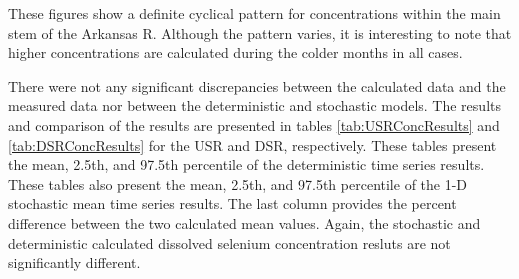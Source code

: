 These figures show a definite cyclical pattern for concentrations within the main stem of the Arkansas R.  Although the pattern varies, it is interesting to note that higher concentrations are calculated during the colder months in all cases.

There were not any significant discrepancies between the calculated data and the measured data nor between the deterministic and stochastic models.  The results and comparison of the results are presented in tables \ref{tab:USRConcResults} and \ref{tab:DSRConcResults} for the USR and DSR, respectively.  These tables present the mean, 2.5th, and 97.5th percentile of the deterministic time series results.  These tables also present the mean, 2.5th, and 97.5th percentile of the 1-D stochastic mean time series results.  The last column provides the percent difference between the two calculated mean values.  Again, the stochastic and deterministic calculated dissolved selenium concentration resluts are not significantly different.

\subtabletop
\begin{table}[htbp]
	\centering
  \caption[USR dissolved selenium concentration results table.]{USR dissolved selenium concentration results table.  Values are in units of \si{\micro\gram\per\liter}.}
	\label{tab:USRConcResults}
	\begin{subtable}{\textwidth}
		\centering
		
	\end{subtable}\\
	\tablevspace
	\begin{subtable}{\textwidth}
		\centering
		
	\end{subtable}\\
\end{table}

